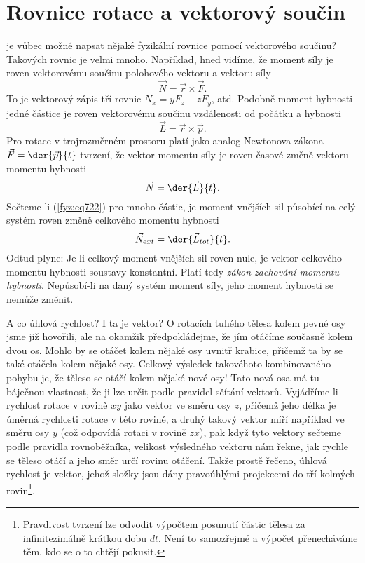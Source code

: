   \section{Rovnice rotace a vektorový součin}\label{fyz:IchapXXsecII}
    je vůbec možné napsat nějaké fyzikální rovnice pomocí vektorového součinu? Takových rovnic je
    velmi mnoho. Například, hned vidíme, že moment síly je roven vektorovému součinu polohového
    vektoru a vektoru síly
    \begin{equation}\label{fyz:eq720}
      \vec{N} = \vec{r}\times\vec{F}.
    \end{equation}
    To je vektorový zápis tří rovnic \(N_x = yF_z - zF_y\), atd. Podobně moment hybnosti jedné
    částice je roven vektorovému součinu vzdálenosti od počátku a hybnosti
    \begin{equation}\label{fyz:eq721}
      \vec{L} = \vec{r}\times\vec{p}.
    \end{equation}
    Pro rotace v trojrozměrném prostoru platí jako analog Newtonova zákona \(\vec{F} =
    \der{\vec{p}}{t}\) tvrzení, že vektor momentu síly je roven časové změně vektoru momentu hybnosti
    \begin{equation}\label{fyz:eq722}
      \vec{N} = \der{\vec{L}}{t}.
    \end{equation} 
    Sečteme-li (\ref{fyz:eq722}) pro mnoho částic, je moment vnějších sil působící na celý systém
    roven změně celkového momentu hybnosti
    \begin{equation}\label{fyz:eq723}
      \vec{N}_{ext} = \der{\vec{L}_{tot}}{t}.
    \end{equation}   
    Odtud plyne: Je-li celkový moment vnějších sil roven nule, je vektor celkového momentu hybnosti
    soustavy konstantní. Platí tedy \emph{zákon zachování momentu hybnosti}. Nepůsobí-li na daný
    systém moment síly, jeho moment hybnosti se nemůže změnit.

    A co úhlová rychlost? I ta je vektor? O rotacích tuhého tělesa kolem pevné osy jsme již
    hovořili, ale na okamžik předpokládejme, že jím otáčíme současně kolem dvou os. Mohlo by se
    otáčet kolem nějaké osy uvnitř krabice, přičemž ta by se také otáčela kolem nějaké osy. Celkový
    výsledek takovéhoto kombinovaného pohybu je, že těleso se otáčí kolem nějaké nové osy! Tato nová
    osa má tu báječnou vlastnost, že ji lze určit podle pravidel sčítání vektorů. Vyjádříme-li
    rychlost rotace v rovině \(xy\) jako vektor ve směru osy \(z\), přičemž jeho délka je úměrná
    rychlosti rotace v této rovině, a druhý takový vektor míří například ve směru osy \(y\) (což
    odpovídá rotaci v rovině \(zx\)), pak když tyto vektory sečteme podle pravidla rovnoběžníka,
    velikost výsledného vektoru nám řekne, jak rychle se těleso otáčí a jeho směr určí rovinu
    otáčení. Takže prostě řečeno, úhlová rychlost je vektor, jehož složky jsou dány pravoúhlými
    projekcemi do tří kolmých rovin\footnote{Pravdivost tvrzení lze odvodit výpočtem posunutí částic
    tělesa za infinitezimálně krátkou dobu \(dt\). Není to samozřejmé a výpočet přenecháváme těm,
    kdo se o to chtějí pokusit.}.

